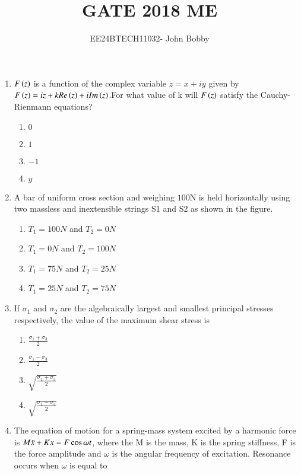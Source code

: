 \documentclass[journal,12pt,onecolumn]{IEEEtran}
\theoremstyle{remark}
\begin{document}

\vspace{3cm}

\title{\textbf{GATE 2018 ME}}
\author{EE24BTECH11032- John Bobby}
\maketitle
\bigskip

\renewcommand{\thefigure}{\theenumi}
\renewcommand{\thetable}{\theenumi}
\setlength{\columnsep}{2.5em}
\begin{enumerate}
    \item $F\left(z\right)$ is a function of the complex variable $z=x+iy$ given by $F\left(z\right)=iz+kRe\left(z\right)+iIm\left(z\right)$.For what value of k will $F\left(z\right)$ satisfy the Cauchy-Rienmann equations?
    \begin{enumerate}
        \item $0$
        \item $1$
        \item $-1$
        \item $y$
    \end{enumerate}
    \item A bar of uniform cross section and weighing $100$N is held horizontally using two massless and inextensible strings S1 and S2 as shown in the figure.\\
    
    \begin{enumerate}
        \item $T_1=100N$ and $T_2=0N$
        \item $T_1=0N$ and $T_2=100N$
        \item $T_1=75N$ and $T_2=25N$
        \item $T_1=25N$ and $T_2=75N$
    \end{enumerate}
    \item If $\sigma_1$ and $\sigma_2$ are the algebraically largest and smallest principal stresses respectively, the value of the maximum shear stress is
    \begin{enumerate}
        \item $\frac{\sigma_1+\sigma_3}{2}$
        \item $\frac{\sigma_1-\sigma_3}{2}$
        \item $\sqrt{\frac{\sigma_1+\sigma_3}{2}}$
        \item $\sqrt{\frac{\sigma_1-\sigma_3}{2}}$
    \end{enumerate}
    \item The equation of motion for a spring-mass system excited by a harmonic force is $M\Ddot{x}+Kx=F\cos{\omega t}$, where the M is the mass, K is the spring stiffness, F is the force amplitude and $\omega$ is the angular frequency of excitation. Resonance occurs when $\omega$ is equal to 

\end{enumerate}
\end{document}
